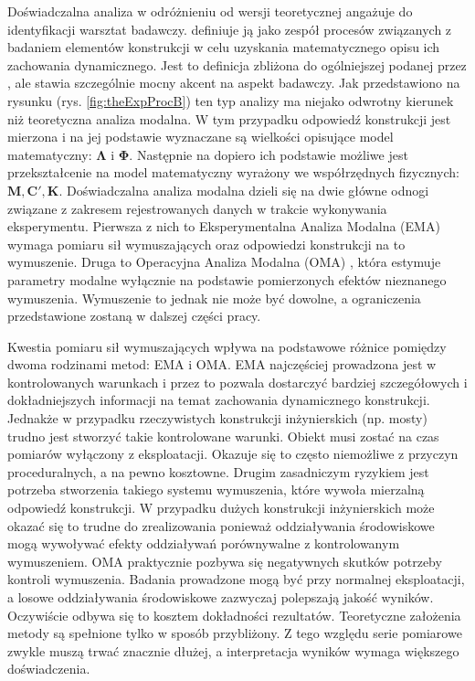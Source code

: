 Doświadczalna analiza w odróżnieniu od wersji teoretycznej angażuje do identyfikacji warsztat badawczy. \cite{Ewins2000} definiuje ją jako zespół procesów związanych z badaniem elementów konstrukcji w celu uzyskania matematycznego opisu ich zachowania dynamicznego. Jest to definicja zbliżona do ogólniejszej podanej przez \cite{Zhang2004}, ale stawia szczególnie mocny akcent na aspekt badawczy. Jak przedstawiono na rysunku (rys. \ref{fig:theExpProcB}) ten typ analizy ma niejako odwrotny kierunek niż teoretyczna analiza modalna. W tym przypadku odpowiedź konstrukcji jest mierzona i na jej podstawie wyznaczane są wielkości opisujące model matematyczny: $\mathbf{\Lambda}$ i $\mathbf{\Phi}$. Następnie na dopiero ich podstawie możliwe jest przekształcenie na model matematyczny wyrażony we współrzędnych fizycznych: $\mathbf{M}, \mathbf{C}', \mathbf{K}$. 
Doświadczalna analiza modalna dzieli się na dwie główne odnogi związane z zakresem rejestrowanych danych w trakcie wykonywania eksperymentu. Pierwsza z nich to Eksperymentalna Analiza Modalna (EMA)  wymaga pomiaru sił wymuszających oraz odpowiedzi konstrukcji na to wymuszenie. Druga to Operacyjna Analiza Modalna (OMA) , która estymuje parametry modalne wyłącznie na podstawie pomierzonych efektów nieznanego wymuszenia. Wymuszenie to jednak nie może być dowolne, a ograniczenia przedstawione zostaną w dalszej części pracy. 

Kwestia pomiaru sił wymuszających wpływa na podstawowe różnice pomiędzy dwoma rodzinami metod: EMA i OMA. EMA najczęściej prowadzona jest w kontrolowanych warunkach i przez to pozwala dostarczyć bardziej szczegółowych i dokładniejszych informacji na temat zachowania dynamicznego konstrukcji. Jednakże w przypadku rzeczywistych konstrukcji inżynierskich (np. mosty) trudno jest stworzyć takie kontrolowane warunki. Obiekt musi zostać na czas pomiarów wyłączony z eksploatacji. Okazuje się to często niemożliwe z przyczyn proceduralnych, a na pewno kosztowne. Drugim zasadniczym ryzykiem jest potrzeba stworzenia takiego systemu wymuszenia, które wywoła mierzalną odpowiedź konstrukcji. W przypadku dużych konstrukcji inżynierskich może okazać się to trudne do zrealizowania ponieważ oddziaływania środowiskowe mogą wywoływać efekty oddziaływań porównywalne z kontrolowanym wymuszeniem. OMA praktycznie pozbywa się negatywnych skutków potrzeby kontroli wymuszenia. Badania prowadzone mogą być przy normalnej eksploatacji, a losowe oddziaływania środowiskowe zazwyczaj polepszają jakość wyników. Oczywiście odbywa się to kosztem dokładności rezultatów. Teoretyczne założenia metody są spełnione tylko w sposób przybliżony. Z tego względu serie pomiarowe zwykle muszą trwać znacznie dłużej, a interpretacja wyników wymaga większego doświadczenia.

